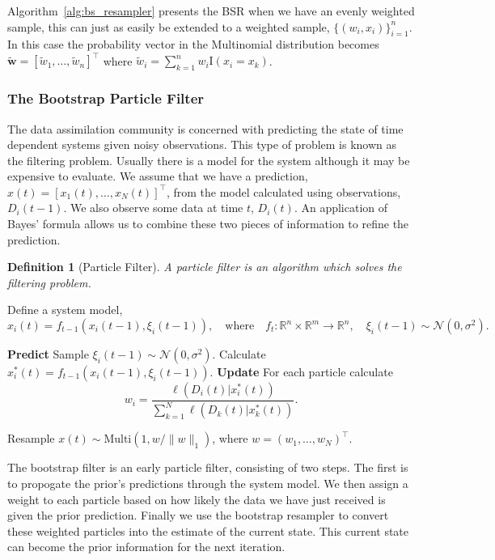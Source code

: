 \documentclass[final]{siamltex}
\let\oldnl\nl%
\newcommand{\nonl}{\renewcommand{\nl}{\let\nl\oldnl}}%
\newtheorem{dfn}{Definition}[section]
\begin{document}
Algorithm~\ref{alg:bs_resampler} presents the BSR when we have an evenly weighted sample, this can
just as easily be extended to a weighted sample, $\{(w_i, x_i)\}_{i=1}^n$. In this case the
probability vector in the Multinomial distribution becomes $\tilde{\mathbf{w}} = [\tilde{w}_1,
\dots, \tilde{w}_n]^\top$ where $\tilde{w}_i = \sum_{k=1}^n \! w_i\text{I}(x_i = x_k)$.


\subsubsection{The Bootstrap Particle Filter}

The data assimilation community is concerned with predicting the state of time dependent systems
given noisy observations. This type of problem is known as the filtering problem. Usually there is a
model for the system although it may be expensive to evaluate. We assume that we have a prediction,
$x(t)=[x_1(t),\dots,x_N(t)]^\top$, from the model calculated using observations, $D_i(t-1)$. We also
observe some data at time $t$, $D_i(t)$. An application of Bayes' formula allows us to combine these
two pieces of information to refine the prediction.
\begin{dfn}[Particle Filter]
A particle filter is an algorithm which solves the filtering problem.
\end{dfn}

\begin{table}[htpb]
\begin{algorithm}[H]
\DontPrintSemicolon
\BlankLine
Define a system model,
\[
	x_i(t) = f_{t-1}(x_i(t-1), \xi_i(t-1)), \quad \text{where} \quad f_t\colon
		\mathbb{R}^n\times\mathbb{R}^m\rightarrow\mathbb{R}^n, \quad \xi_i(t-1) \sim \mathcal{N}(0,
\sigma^2).
\]

\nonl \textbf{Predict}\;
Sample $\xi_i(t-1) \sim \mathcal{N}(0, \sigma^2)$.\;
Calculate $x_i^*(t) = f_{t-1}(x_i(t-1), \xi_i(t-1))$.\;
\nonl\;
\nonl \textbf{Update}\;
For each particle calculate
\[
	w_i = \frac{\ell(D_i(t)| x_i^*(t))}{\sum_{k=1}^N \! \ell(D_k(t)| x_k^*(t))}.
\]

Resample $x(t) \sim \text{Multi}(1, w/\|w\|_1)$, where $w = (w_1,\dots,w_N)^\top$.
\caption{The Bootstrap Particle Filter~\cite{gordon1993novel}.\label{alg:bs_filter}}
\end{algorithm}
\end{table}
The bootstrap filter is an early particle filter, consisting of two steps. The first is to propogate
the prior's predictions through the system model. We then assign a weight to each particle based on
how likely the data we have just received is given the prior prediction. Finally we use the
bootstrap resampler to convert these weighted particles into the estimate of the current state. This
current state can become the prior information for the next iteration.
\end{document}
